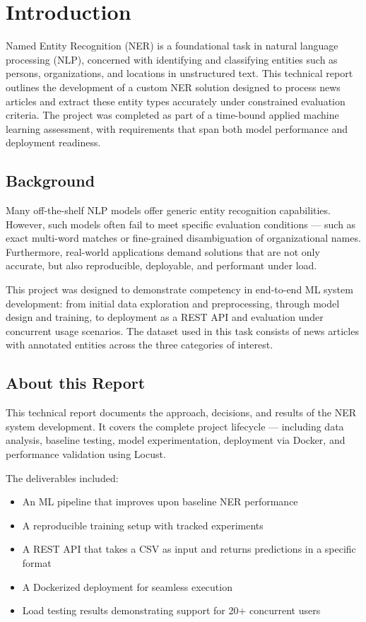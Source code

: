 \chapter{Introduction}
\label{ch:Introduction}
 \setcounter{page}{1}

Named Entity Recognition (NER) is a foundational task in natural language processing (NLP), concerned with identifying and classifying entities such as persons, organizations, and locations in unstructured text. This technical report outlines the development of a custom NER solution designed to process news articles and extract these entity types accurately under constrained evaluation criteria. The project was completed as part of a time-bound applied machine learning assessment, with requirements that span both model performance and deployment readiness.

\section{Background}

Many off-the-shelf NLP models offer generic entity recognition capabilities. However, such models often fail to meet specific evaluation conditions — such as exact multi-word matches or fine-grained disambiguation of organizational names. Furthermore, real-world applications demand solutions that are not only accurate, but also reproducible, deployable, and performant under load.

This project was designed to demonstrate competency in end-to-end ML system development: from initial data exploration and preprocessing, through model design and training, to deployment as a REST API and evaluation under concurrent usage scenarios. The dataset used in this task consists of news articles with annotated entities across the three categories of interest.

\section{About this Report}

This technical report documents the approach, decisions, and results of the NER system development. It covers the complete project lifecycle — including data analysis, baseline testing, model experimentation, deployment via Docker, and performance validation using Locust.

The deliverables included:
\begin{itemize}
  \item An ML pipeline that improves upon baseline NER performance
  \item A reproducible training setup with tracked experiments
  \item A REST API that takes a CSV as input and returns predictions in a specific format
  \item A Dockerized deployment for seamless execution
  \item Load testing results demonstrating support for 20+ concurrent users
\end{itemize}

